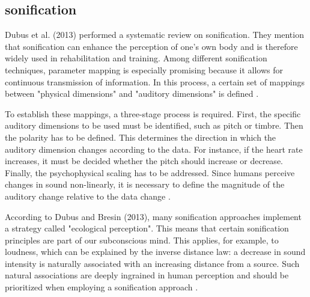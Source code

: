 \subsection{sonification}


Dubus et al. (2013) performed a systematic review on sonification. They mention that sonification can enhance the perception of one's own body and is therefore widely used in rehabilitation and training. Among different sonification techniques, parameter mapping is especially promising because it allows for continuous transmission of information. In this process, a certain set of mappings between "physical dimensions" and "auditory dimensions" is defined \cite{dubus2013systematic}.

To establish these mappings, a three-stage process is required. First, the specific auditory dimensions to be used must be identified, such as pitch or timbre. Then the polarity has to be defined. This determines the direction in which the auditory dimension changes according to the data. For instance, if the heart rate increases, it must be decided whether the pitch should increase or decrease. Finally, the psychophysical scaling has to be addressed. Since humans perceive changes in sound non-linearly, it is necessary to define the magnitude of the auditory change relative to the data change \cite{dubus2013systematic} \cite{walker2000psychophysical}.

According to Dubus and Bresin (2013), many sonification approaches implement a strategy called "ecological perception". This means that certain sonification principles are part of our subconscious mind. This applies, for example, to loudness, which can be explained by the inverse distance law: a decrease in sound intensity is naturally associated with an increasing distance from a source. Such natural associations are deeply ingrained in human perception and should be prioritized when employing a sonification approach \cite{dubus2013systematic}.


